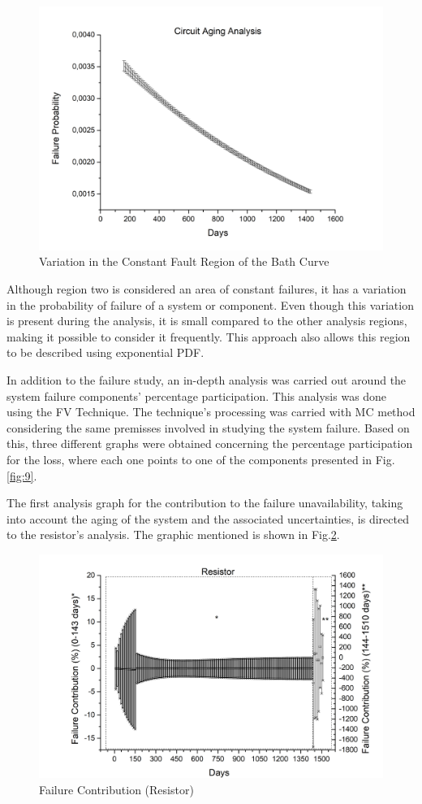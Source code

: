 \documentclass{ws-m3as}
\begin{document}
\begin{figure} [H]
	\centering
	\includegraphics[width=0.75\linewidth]{"Figures/Circuit Failure Probability Regiao 2"}
	\caption{Variation in the Constant Fault Region of the Bath Curve}
	\label{fig:circuit-failure-probability-regiao-2}
	\label{fig:11}	
\end{figure}

Although region two is considered an area of constant failures, it has a variation in the probability of failure of a system or component. Even though this variation is present during the analysis, it is small compared to the other analysis regions, making it possible to consider it frequently. This approach also allows this region to be described using exponential PDF.

In addition to the failure study, an in-depth analysis was carried out around the system failure components' percentage participation. This analysis was done using the FV Technique. The technique's processing was carried with MC method considering the same premisses involved in studying the system failure. Based on this, three different graphs were obtained concerning the percentage participation for the loss, where each one points to one of the components presented in Fig.\ref{fig:9}. 

The first analysis graph for the contribution to the failure unavailability, taking into account the aging of the system and the associated uncertainties, is directed to the resistor's analysis. The graphic mentioned is shown in Fig.\ref{fig:12}. 

\begin{figure} [H]
	\centering
	\includegraphics[width=0.8\linewidth]{Figures/RFFull}
	\caption{Failure Contribution (Resistor)}
	\label{fig:rffull}
	\label{fig:12}	
\end{figure}
 
\end{document}
